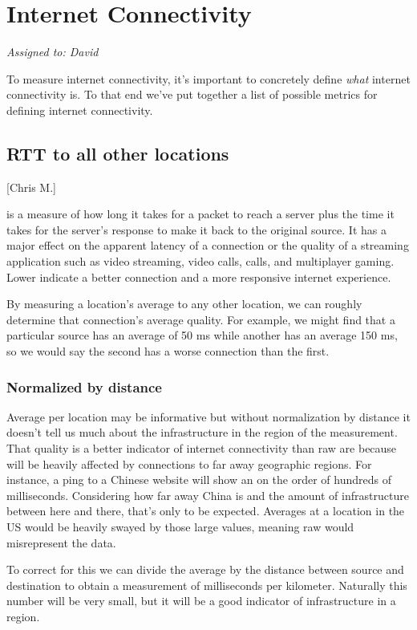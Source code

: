 \section{Internet Connectivity}\label{sec:background_connectivity}
\textit{Assigned to: David}

To measure internet connectivity, it's important to concretely define \textit{what} internet connectivity is. To that end we've put together a list of possible metrics for defining internet connectivity.

\subsection{RTT to all other locations}[Chris M.]
\label{sec:raw-rtt-everything}

\RTT is a measure of how long it takes for a packet to reach a server plus the time it takes for the server's response to make it back to the original source. It has a major effect on the apparent latency of a connection or the quality of a streaming application such as video streaming, video calls, \voip calls, and multiplayer gaming. Lower \rtts indicate a better connection and a more responsive internet experience.

By measuring a location's average \rtt to any other location, we can roughly determine that connection's average quality. For example, we might find that a particular source has an average \rtt of 50 ms while another has an average 150 ms, so we would say the second has a worse connection than the first.

\subsubsection{Normalized by distance}

Average \rtt per location may be informative but without normalization by distance it doesn't tell us much about the infrastructure in the region of the measurement. That quality is a better indicator of internet connectivity than raw \rtts are because \rtts will be heavily affected by connections to far away geographic regions. For instance, a ping to a Chinese website will show an \rtt on the order of hundreds of milliseconds. Considering how far away China is and the amount of infrastructure between here and there, that's only to be expected. Averages at a location in the US would be heavily swayed by those large values, meaning raw \rtt would misrepresent the data.

To correct for this we can divide the average \rtt by the distance between source and destination to obtain a measurement of milliseconds per kilometer. Naturally this number will be very small, but it will be a good indicator of infrastructure in a region.

